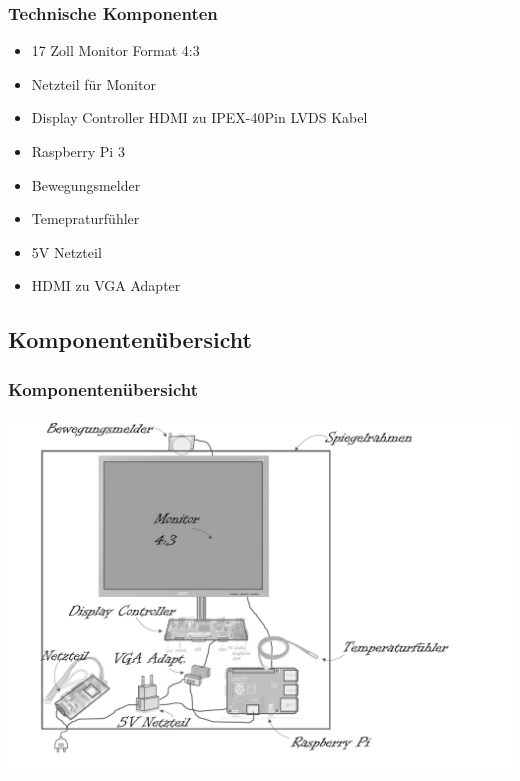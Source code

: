 \documentclass[11pt]{beamer}
\begin{document}
	\begin{frame}
		\frametitle{Technische Komponenten}
		\begin{itemize}
		\item 17 Zoll Monitor Format 4:3
		\item Netzteil für Monitor
		\item Display Controller HDMI zu IPEX-40Pin LVDS Kabel 
		\item Raspberry Pi 3
		\item Bewegungsmelder
		\item Temepraturfühler
		\item 5V Netzteil
		\item HDMI zu VGA Adapter
		\end{itemize}
	\end{frame}

	\subsection{Komponenten\"übersicht}
	\begin{frame}
		\frametitle{Komponenten\"ubersicht}
		\includegraphics[scale = 0.4]{images/smartMirrorExplosionsskizze.pdf}
	\end{frame}
\end{document}
